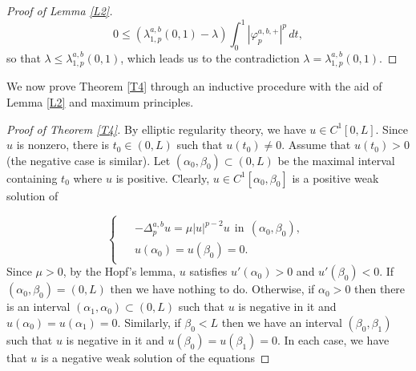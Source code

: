 \documentclass[a4paper,11pt]{article}
\begin{document}
{\begin{proof}[Proof of Lemma \ref{L2}]
\[
0 \leq \left(\lambda_{1,p}^{a,b}(0,1) - \lambda\right)\int_{0}^{1}|\varphi_{p}^{a,b,+}|^{p} \,dt,
\]
so that $\lambda \leq \lambda_{1,p}^{a,b}(0,1)$, which leads us to the contradiction $\lambda = \lambda_{1,p}^{a,b}(0,1)$.
\end{proof}

We now prove Theorem \ref{T4} through an inductive procedure with the aid of Lemma \ref{L2} and maximum principles.

\begin{proof}[Proof of Theorem \ref{T4}] By elliptic regularity theory, we have $u \in C^1[0,L]$. Since $u$ is nonzero, there is $t_{0} \in (0, L)$ such that $u(t_{0}) \neq 0$. Assume that $u(t_{0}) > 0$ (the negative case is similar). Let $(\alpha_{0},\beta_{0}) \subset (0,L)$ be the maximal interval containing $t_{0}$ where $u$ is positive. Clearly, $u \in C^1[\alpha_{0},\beta_{0}]$ is a positive weak solution of

\begin{equation}\label{mu1}
\begin{cases}
\begin{aligned}
& - \Delta_{p}^{a,b} u = \mu|u|^{p-2}u \ \ \text{in} \ \ (\alpha_{0},\beta_{0}), \\
& u(\alpha_{0}) = u(\beta_{0}) = 0.
\end{aligned}
\end{cases}
\end{equation}
Since $\mu > 0$, by the Hopf's lemma, $u$ satisfies $u'(\alpha_{0}) > 0$ and $u'(\beta_{0}) < 0$. If $(\alpha_{0},\beta_{0}) = (0,L)$ then we have nothing to do. Otherwise, if $\alpha_{0} > 0$ then there is an interval $(\alpha_{1},\alpha_{0}) \subset (0,L)$ such that $u$ is negative in it and $u(\alpha_{0}) = u(\alpha_{1}) = 0$. Similarly, if $\beta_{0} < L$ then we have an interval $(\beta_{0},\beta_{1})$ such that $u$ is negative in it and $u(\beta_{0}) = u(\beta_{1}) = 0$. In each case, we have that $u$ is a negative weak solution of the equations


\end{proof}}
\end{document}
